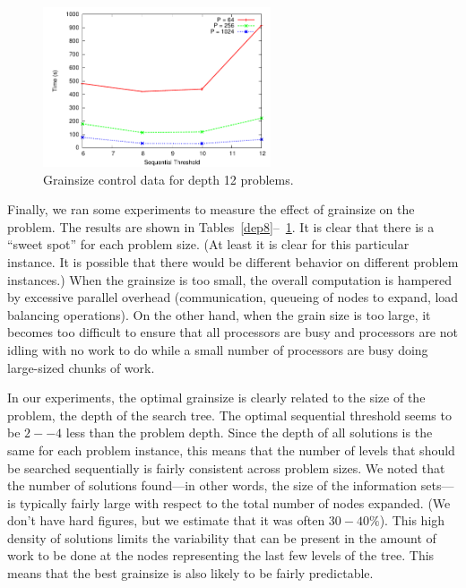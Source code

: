 \documentclass[11pt]{article}
\begin{document}
\begin{figure}[h]
\centering
\includegraphics[width=0.6\textwidth]{plots/dep12.pdf}
\caption{Grainsize control data for depth 12 problems.}
\label{dep12}
\end{figure}

Finally, we ran some experiments to measure the effect of grainsize on the problem.  The results are shown in
Tables~\ref{dep8}--~\ref{dep12}.  It is clear that there is a ``sweet spot'' for each problem size.  (At least it is
clear for this particular instance.  It is possible that there would be different behavior on different problem
instances.)  When the grainsize is too small, the overall computation is hampered by excessive parallel overhead
(communication, queueing of nodes to expand, load balancing operations).  On the other hand, when the grain size is too
large, it becomes too difficult to ensure that all processors are busy and processors are not idling with no work to do
while a small number of processors are busy doing large-sized chunks of work.  

In our experiments, the optimal grainsize is clearly related to the size of the problem, the depth of the search tree.
The optimal sequential threshold seems to be $2--4$ less than the problem depth.  Since the depth of all solutions is
the same for each problem instance, this means that the number of levels that should be searched sequentially is fairly
consistent across problem sizes.  We noted that the number of solutions found---in other words, the size of the
information sets---is typically fairly large with respect to the total number of nodes expanded.  (We don't have hard
figures, but we estimate that it was often $30-40\%$).  This high density of solutions limits the variability that can
be present in the amount of work to be done at the nodes representing the last few levels of the tree.  This means that
the best grainsize is also likely to be fairly predictable.  
\end{document}
